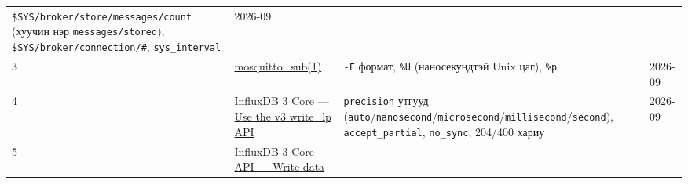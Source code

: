 \begin{longtable}[]{@{}llll@{}}
\begin{minipage}[t]{0.22\columnwidth}
\texttt{\$SYS/\allowbreak{}broker/\allowbreak{}store/\allowbreak{}messages/\allowbreak{}count} (хуучин нэр \texttt{messages/stored}), \texttt{\$SYS/\allowbreak{}broker/\allowbreak{}connection/\allowbreak{}\#}, \texttt{sys\_interval}\strut
\end{minipage} & \begin{minipage}[t]{0.22\columnwidth}\raggedright
2026-09\strut
\end{minipage}\tabularnewline
\begin{minipage}[t]{0.22\columnwidth}\raggedright
3\strut
\end{minipage} & \begin{minipage}[t]{0.22\columnwidth}\raggedright
\href{https://mosquitto.org/man/mosquitto_sub-1.html}{mosquitto\_sub(1)}\strut
\end{minipage} & \begin{minipage}[t]{0.22\columnwidth}\raggedright
\texttt{-F} формат, \texttt{\%U} (наносекундтэй Unix цаг), \texttt{\%p}\strut
\end{minipage} & \begin{minipage}[t]{0.22\columnwidth}\raggedright
2026-09\strut
\end{minipage}\tabularnewline
\begin{minipage}[t]{0.22\columnwidth}\raggedright
4\strut
\end{minipage} & \begin{minipage}[t]{0.22\columnwidth}\raggedright
\href{https://docs.influxdata.com/influxdb3/core/write-data/http-api/v3-write-lp/}{InfluxDB 3 Core --- Use the v3 write\_\allowbreak{}lp API}\strut
\end{minipage} & \begin{minipage}[t]{0.22\columnwidth}\raggedright
\texttt{precision} утгууд (\texttt{auto}/\allowbreak\texttt{nanosecond}/\allowbreak\texttt{microsecond}/\allowbreak\texttt{millisecond}/\allowbreak\texttt{second}), \texttt{accept\_partial}, \texttt{no\_sync}, 204/400 хариу\strut
\end{minipage} & \begin{minipage}[t]{0.22\columnwidth}\raggedright
2026-09\strut
\end{minipage}\tabularnewline
\begin{minipage}[t]{0.22\columnwidth}\raggedright
5\strut
\end{minipage} & \begin{minipage}[t]{0.22\columnwidth}\raggedright
\href{https://docs.influxdata.com/influxdb3/core/api/write-data/}{InfluxDB 3 Core API --- Write data}\strut

\end{minipage}
\end{longtable}
